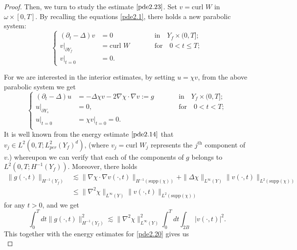 \documentclass[13pt,CJK]{article}
\theoremstyle{plain}                       %
\theoremstyle{remark}
\numberwithin{equation}{section}
\begin{document}
\begin{proof}
Then, we turn to study the estimate $\eqref{pde2.23}$.
Set $v=\text{curl~}W$ in $\omega\times[0,T]$. By recalling
the equations \eqref{pde2.1}, there holds a new parabolic system:
\begin{equation*}
\left\{
\begin{aligned}
(\partial_t-\Delta)v&=0&\qquad&\text{in}\quad Y_f\times(0,T];\\
v|_{\partial Y_f}&=\text{curl~} W&\qquad&\text{for}\quad  0<t\leq T;\\
v|_{t=0}&=0.&\qquad&
\end{aligned}
\right.
\end{equation*}

For we are interested in the interior estimates, by setting $u=\chi v$,
from the above parabolic system we get
\begin{equation}\label{pde2.20}
\left\{
\begin{aligned}
(\partial_t-\Delta)u&=-\Delta \chi v-2\nabla\chi\cdot\nabla v:=g&\qquad&\text{in}\quad Y_f\times(0,T];\\
u|_{\partial Y_s}&=0,&\qquad&\text{for}\quad 0<t<T;\\
u|_{t=0}&=\chi v|_{t=0}=0.&\qquad&\\
\end{aligned}
\right.
\end{equation}
It is well known from the energy estimate $\eqref{pde2.14}$ that
$v_j\in L^2(0,T;L^2_{per}(Y_f)^d)$,
(where $v_j = \text{curl~}W_j$ represents
the $j^{\text{th}}$ component of $v$.) whereupon we can verify that
each of the components of $g$ belongs to
$L^2(0,T; H^{-1}(Y_{f}))$. Moreover, there holds
\begin{equation*}
\begin{aligned}
\|g(\cdot,t)\|_{H^{-1}(Y_f)}&\lesssim
\|\nabla\chi\cdot\nabla v(\cdot,t)\|_{H^{-1}(\text{supp}(\chi))}
+\|\Delta\chi\|_{L^{\infty}(Y)}
\|v(\cdot,t)\|_{L^2(\text{supp}(\chi))}\\
&\leq\|\nabla^2\chi\|_{L^{\infty}(Y)}
\|v(\cdot,t)\|_{L^2(\text{supp}(\chi))}
\end{aligned}
\end{equation*}
for any $t>0$, and we get
\begin{equation*}
\int_{0}^{T}dt\|g(\cdot,t)\|^2_{H^{-1}
(Y_f)}\lesssim
\|\nabla^2\chi\|^2_{L^{\infty}(Y)}\int_{0}^{T}dt
\int_{2B}|v(\cdot,t)|^2.
\end{equation*}
This together with the energy estimates for \eqref{pde2.20} gives us
\begin{equation}\label{pde2.21}

\end{equation}
\end{proof}
\end{document}
